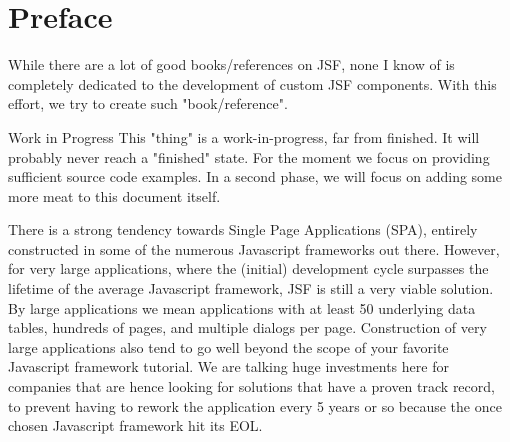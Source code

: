 %

\chapter*{Preface}
While there are a lot of good books/references on JSF, none I know of is completely dedicated to the development of custom JSF components.
With this effort, we try to create such "book/reference".

\begin{TODO}{Work in Progress}
	This "thing" is a work-in-progress, far from finished.
	It will probably never reach a "finished" state.
	For the moment we focus on providing sufficient source code examples.
	In a second phase, we will focus on adding some more meat to this document itself.
\end{TODO}

There is a strong tendency towards Single Page Applications (SPA), entirely constructed in some of the numerous Javascript frameworks out there.
However, for very large applications, where the (initial) development cycle surpasses the lifetime of the average Javascript framework, JSF is still a very viable solution.
By large applications we mean applications with at least 50 underlying data tables, hundreds of pages, and multiple dialogs per page.
Construction of very large applications also tend to go well beyond the scope of your favorite Javascript framework tutorial.
We are talking huge investments here for companies that are hence looking for solutions that have a proven track record, to prevent having to rework the application every 5 years or so because the once chosen Javascript framework hit its EOL.

